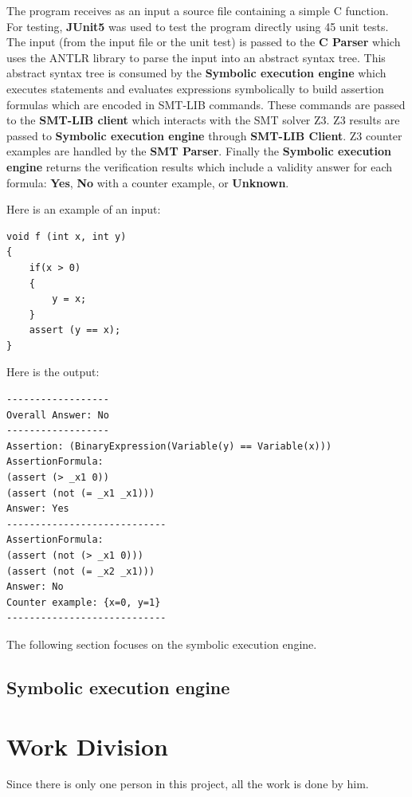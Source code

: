 \documentclass[12pt,a4paper]{article}
\begin{document}
The program receives as an input a source file containing a simple C function. For testing, \textbf{JUnit5} was used to test the program directly using 45 unit tests. The input (from the input file or the unit test) is passed to the \textbf{C Parser} which uses the ANTLR library to parse the input into an abstract syntax tree. This abstract syntax tree is consumed by the \textbf{Symbolic execution engine} which executes statements and evaluates expressions symbolically to build assertion formulas which are encoded in SMT-LIB commands. These commands are passed to the \textbf{SMT-LIB client} which interacts with the SMT solver Z3.  
Z3 results are passed to \textbf{Symbolic execution engine} through \textbf{SMT-LIB Client}. Z3 counter examples are handled by the \textbf{SMT Parser}. Finally the \textbf{Symbolic execution engine} returns the verification results which include a validity answer for each formula: \textbf{Yes}, \textbf{No} with a counter example, or \textbf{Unknown}. 


Here is an example of an input:




\begin{lstlisting}  
void f (int x, int y)
{
    if(x > 0)
    {
        y = x;
    }
    assert (y == x);
}
\end{lstlisting}

Here is the output:


\begin{lstlisting} 
------------------
Overall Answer: No
------------------
Assertion: (BinaryExpression(Variable(y) == Variable(x)))
AssertionFormula:
(assert (> _x1 0))
(assert (not (= _x1 _x1)))
Answer: Yes
----------------------------
AssertionFormula:
(assert (not (> _x1 0)))
(assert (not (= _x2 _x1)))
Answer: No
Counter example: {x=0, y=1}
----------------------------

\end{lstlisting} 

The following section focuses on the symbolic execution engine. 

\subsection{Symbolic execution engine} \label{sec:execution}


\section{Work Division} 

Since there is only one person in this project, all the work is done by him. 




\end{document}
